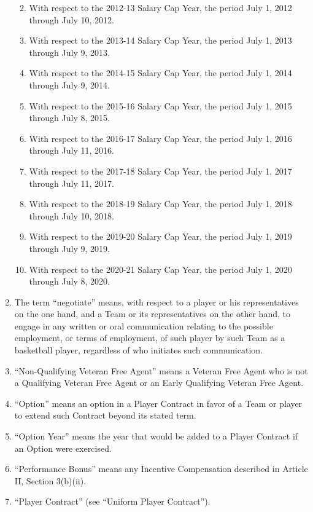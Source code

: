 \documentclass[
]{book}
\providecommand{\tightlist}{%
  \setlength{\itemsep}{0pt}\setlength{\parskip}{0pt}}
\begin{document}
\begin{enumerate}
  \begin{enumerate}
  \def\labelenumii{(\roman{enumii})}
  \tightlist
  \item
    With respect to the 2012-13 Salary Cap Year, the period July 1, 2012 through July 10, 2012.
  \item
    With respect to the 2013-14 Salary Cap Year, the period July 1, 2013 through July 9, 2013.
  \item
    With respect to the 2014-15 Salary Cap Year, the period July 1, 2014 through July 9, 2014.
  \item
    With respect to the 2015-16 Salary Cap Year, the period July 1, 2015 through July 8, 2015.
  \item
    With respect to the 2016-17 Salary Cap Year, the period July 1, 2016 through July 11, 2016.
  \item
    With respect to the 2017-18 Salary Cap Year, the period July 1, 2017 through July 11, 2017.
  \item
    With respect to the 2018-19 Salary Cap Year, the period July 1, 2018 through July 10, 2018.
  \item
    With respect to the 2019-20 Salary Cap Year, the period July 1, 2019 through July 9, 2019.
  \item
    With respect to the 2020-21 Salary Cap Year, the period July 1, 2020 through July 8, 2020.
  \end{enumerate}
\item
  The term ``negotiate'' means, with respect to a player or his representatives on the one hand, and a Team or its representatives on the other hand, to engage in any written or oral communication relating to the possible employment, or terms of employment, of such player by such Team as a basketball player, regardless of who initiates such communication.
\item
  ``Non-Qualifying Veteran Free Agent'' means a Veteran Free Agent who is not a Qualifying Veteran Free Agent or an Early Qualifying Veteran Free Agent.
\item
  ``Option'' means an option in a Player Contract in favor of a Team or player to extend such Contract beyond its stated term.
\item
  ``Option Year'' means the year that would be added to a Player Contract if an Option were exercised.
\item
  ``Performance Bonus'' means any Incentive Compensation described in Article II, Section 3(b)(ii).
\item
  ``Player Contract'' (see ``Uniform Player Contract'').

\end{enumerate}
\end{document}
